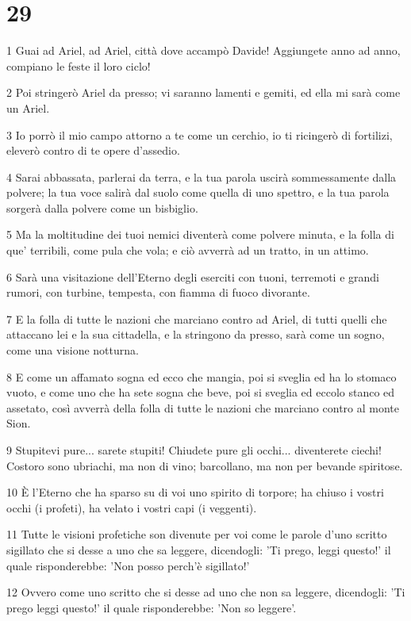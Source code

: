 \chapter{29}

\par 1 Guai ad Ariel, ad Ariel, città dove accampò Davide! Aggiungete anno ad anno, compiano le feste il loro ciclo!
\par 2 Poi stringerò Ariel da presso; vi saranno lamenti e gemiti, ed ella mi sarà come un Ariel.
\par 3 Io porrò il mio campo attorno a te come un cerchio, io ti ricingerò di fortilizi, eleverò contro di te opere d'assedio.
\par 4 Sarai abbassata, parlerai da terra, e la tua parola uscirà sommessamente dalla polvere; la tua voce salirà dal suolo come quella di uno spettro, e la tua parola sorgerà dalla polvere come un bisbiglio.
\par 5 Ma la moltitudine dei tuoi nemici diventerà come polvere minuta, e la folla di que' terribili, come pula che vola; e ciò avverrà ad un tratto, in un attimo.
\par 6 Sarà una visitazione dell'Eterno degli eserciti con tuoni, terremoti e grandi rumori, con turbine, tempesta, con fiamma di fuoco divorante.
\par 7 E la folla di tutte le nazioni che marciano contro ad Ariel, di tutti quelli che attaccano lei e la sua cittadella, e la stringono da presso, sarà come un sogno, come una visione notturna.
\par 8 E come un affamato sogna ed ecco che mangia, poi si sveglia ed ha lo stomaco vuoto, e come uno che ha sete sogna che beve, poi si sveglia ed eccolo stanco ed assetato, così avverrà della folla di tutte le nazioni che marciano contro al monte Sion.
\par 9 Stupitevi pure... sarete stupiti! Chiudete pure gli occhi... diventerete ciechi! Costoro sono ubriachi, ma non di vino; barcollano, ma non per bevande spiritose.
\par 10 È l'Eterno che ha sparso su di voi uno spirito di torpore; ha chiuso i vostri occhi (i profeti), ha velato i vostri capi (i veggenti).
\par 11 Tutte le visioni profetiche son divenute per voi come le parole d'uno scritto sigillato che si desse a uno che sa leggere, dicendogli: 'Ti prego, leggi questo!' il quale risponderebbe: 'Non posso perch'è sigillato!'
\par 12 Ovvero come uno scritto che si desse ad uno che non sa leggere, dicendogli: 'Ti prego leggi questo!' il quale risponderebbe: 'Non so leggere'.
